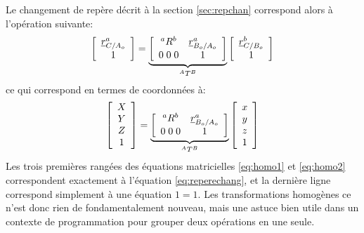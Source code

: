 Le changement de repère décrit à la section \ref{sec:repchan} correspond alors à l'opération suivante:
\begin{align}
	\left[ \begin{array}{c}
			   \underline{r}_{C/A_o}^a \\ 1
	\end{array} \right]
	=
	\underbrace{
		\left[ \begin{array}{c c }
				   ^aR^b & \underline{r}_{B_o/A_o}^a \\ 0 \; 0 \; 0 & 1
		\end{array} \right]
	}_{^AT^B}
	\left[ \begin{array}{c}
			   \underline{r}_{C/B_o}^b \\ 1
	\end{array} \right]
	\label{eq:homo1}
\end{align}
ce qui correspond en termes de coordonnées à:
\begin{align}
	\left[ \begin{array}{c}
			   X \\ Y \\ Z \\ 1
	\end{array} \right]
	=
	\underbrace{
		\left[ \begin{array}{c c }
				   ^aR^b & \underline{r}_{B_o/A_o}^a \\ 0 \; 0 \; 0 & 1
		\end{array} \right]
	}_{^AT^B}
	\left[ \begin{array}{c}
			   x \\ y \\ z \\ 1
	\end{array} \right]
	\label{eq:homo2}
\end{align}
Les trois premières rangées des équations matricielles \eqref{eq:homo1} et \eqref{eq:homo2} correspondent exactement à l'équation \eqref{eq:reperechang}, et la dernière ligne correspond simplement à une équation $1=1$. Les transformations homogènes ce n’est donc rien de fondamentalement nouveau, mais une astuce bien utile dans un contexte de programmation pour grouper deux opérations en une seule. %

